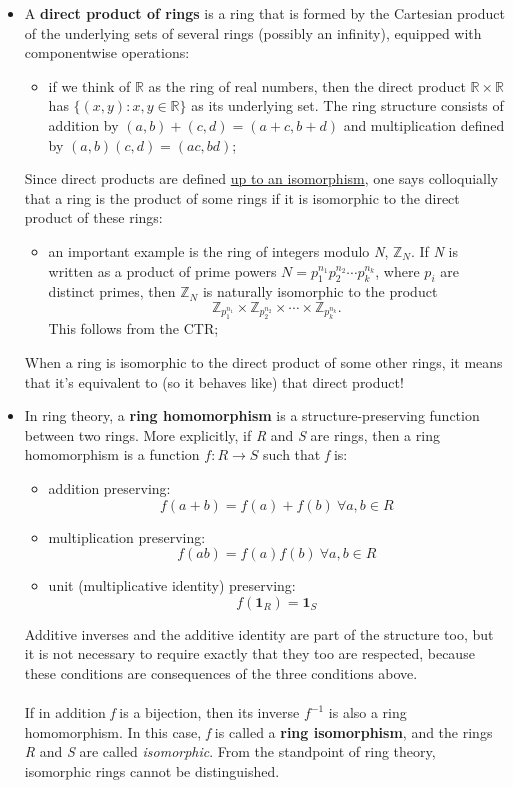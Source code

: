 \documentclass[11pt, a4paper]{article}
\newcommand{\idElement}{
    \textbf{1}
}
\begin{document}
\begin{itemize}
    \item A \textbf{direct product of rings} is a ring that is formed by the Cartesian product of the underlying sets of several rings (possibly an infinity), equipped with componentwise operations:
    \begin{itemize}
        \item if we think of $\mathbb{R}$ as the ring of real numbers, then the direct product $\mathbb{R}\times\mathbb{R}$ has $\{(x,y):x,y\in\mathbb{R}\}$ as its underlying set. The ring structure consists of addition by $(a,b)+(c,d)=(a+c,b+d)$ and multiplication defined by $(a,b)(c,d)=(ac,bd)$;
    \end{itemize}
    Since direct products are defined \underline{up to an isomorphism}, one says colloquially that a ring is the product of some rings if it is isomorphic to the direct product of these rings:
    \begin{itemize}
        \item an important example is the ring of integers modulo \textit{N}, $\mathbb{Z}_N$. If \textit{N} is written as a product of prime powers $N=p_1^{n_1}p_2^{n_2}\cdots p_k^{n_k}$, where $p_i$ are distinct primes, then $\mathbb{Z}_N$ is naturally isomorphic to the product
        $$\mathbb{Z}_{p_1^{n_1}}\times\mathbb{Z}_{p_2^{n_2}}\times\cdots\times\mathbb{Z}_{p_k^{n_k}}.$$
        This follows from the CTR;
    \end{itemize}
    When a ring is isomorphic to the direct product of some other rings, it means that it's equivalent to (so it behaves like) that direct product!
    \item In ring theory, a \textbf{ring homomorphism} is a structure-preserving function between two rings. More explicitly, if \textit{R} and \textit{S} are rings, then a ring homomorphism is a function $f:R\rightarrow S$ such that \textit{f} is:
    \begin{itemize}
        \item addition preserving:$$f(a+b)=f(a)+f(b)\ \forall a,b\in R$$
        \item multiplication preserving:$$f(ab)=f(a)f(b)\ \forall a,b\in R$$
        \item unit (multiplicative identity) preserving:
        $$f(\idElement_R)=\idElement_S$$
    \end{itemize}
    Additive inverses and the additive identity are part of the structure too, but it is not necessary to require exactly that they too are respected, because these conditions are consequences of the three conditions above.\\\\
    If in addition \textit{f} is a bijection, then its inverse $f^{-1}$ is also a ring homomorphism. In this case, \textit{f} is called a \textbf{ring isomorphism}, and the rings \textit{R} and \textit{S} are called \textit{isomorphic}. From the standpoint of ring theory, isomorphic rings cannot be distinguished.
\end{itemize}
\end{document}

